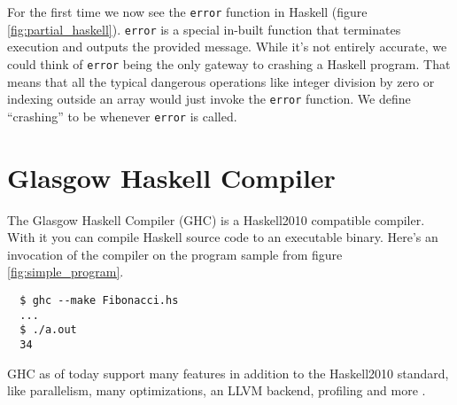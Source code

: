 \begin{figure}
\end{figure}

For the first time we now see the \texttt{error} function in Haskell (figure \ref{fig:partial_haskell}).  \texttt{error} is a
special in-built function that terminates execution and outputs the provided
message. While it's not entirely accurate, we could think of \texttt{error}
being the only gateway to crashing a Haskell program. That means that all the
typical dangerous operations like integer division by zero or indexing outside
an array would just invoke the \texttt{error} function. We define ``crashing''
to be whenever \texttt{error} is called.

\section{Glasgow Haskell Compiler}

The Glasgow Haskell Compiler (GHC) is a Haskell2010 compatible compiler.
\cite{ghc_website} With it you can compile Haskell source code to an executable
binary. Here's an invocation of the compiler on the program sample from figure \ref{fig:simple_program}.

\begin{verbatim}
  $ ghc --make Fibonacci.hs
  ...
  $ ./a.out
  34
\end{verbatim}

GHC as of today support many features in addition to the Haskell2010
standard, like parallelism, many optimizations, an LLVM backend, profiling
and more \cite{ghc_website}.

